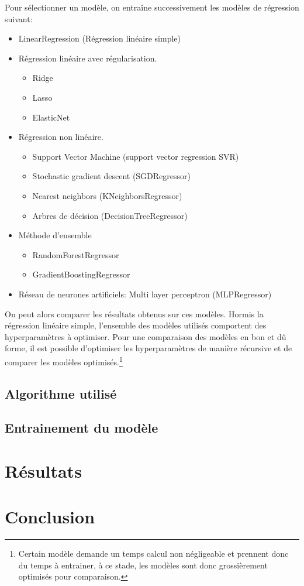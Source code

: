 Pour sélectionner un modèle, on entraîne successivement les modèles de
régression suivant:
\begin{itemize}
  \item LinearRegression (Régression linéaire simple)
  \item Régression linéaire avec régularisation.
  \begin{itemize}
    \item Ridge
    \item Lasso
    \item ElasticNet
  \end{itemize}
  \item Régression non linéaire.
  \begin{itemize}
    \item Support Vector Machine (support vector regression SVR)
    \item Stochastic gradient descent (SGDRegressor)
    \item Nearest neighbors (KNeighborsRegressor)
    \item Arbres de décision (DecisionTreeRegressor)
  \end{itemize}
  \item Méthode d'ensemble
  \begin{itemize}
    \item RandomForestRegressor
    \item GradientBoostingRegressor
  \end{itemize}
  \item Réseau de neurones artificiels: Multi layer perceptron (MLPRegressor)
\end{itemize}

On peut alors comparer les résultats obtenus sur ces modèles.
Hormis la régression linéaire simple, l'ensemble des modèles utilisés comportent
des hyperparamètres à optimiser.
Pour une comparaison des modèles en bon et dû forme, il est possible d'optimiser
les hyperparamètres de manière récursive et de comparer les modèles optimisés.\footnote{Certain modèle demande un temps calcul non négligeable et prennent donc
du temps à entrainer, à ce stade, les modèles sont donc grossièrement optimisés
pour comparaison.}

\subsection{Algorithme utilisé}

\subsection{Entrainement du modèle}



\section{Résultats}



\section{Conclusion}


